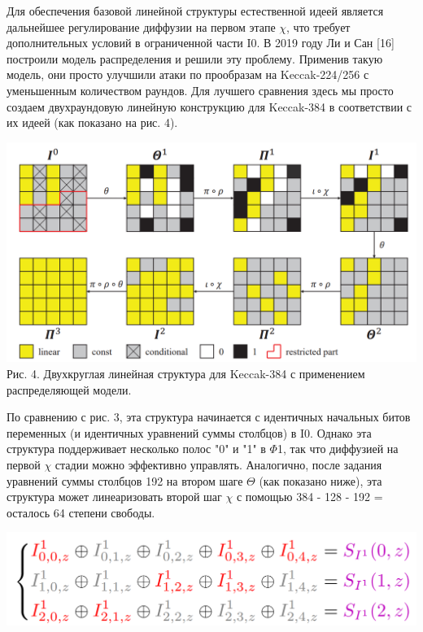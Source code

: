 \documentclass[utf8,14pt,a4paper,oneside,russian]{book}
\begin{document}
Для обеспечения базовой линейной структуры естественной идеей является дальнейшее регулирование
диффузии на первом этапе $\chi$, что требует дополнительных условий в ограниченной части I0.
В 2019 году Ли и Сан [16] построили модель распределения и решили эту проблему.
Применив такую модель, они просто улучшили атаки по прообразам на Keccak-224/256 с уменьшенным количеством раундов.
Для лучшего сравнения здесь мы просто создаем
двухраундовую линейную конструкцию для Keccak-384 в соответствии с их идеей (как показано на рис. 4).

\begin{center}
    \includegraphics*[scale=0.45]{11}\\
    Рис. 4. Двухкруглая линейная структура для Keccak-384 с применением распределяющей модели.
\end{center}

По сравнению с рис. 3, эта структура начинается с идентичных начальных битов переменных
(и идентичных уравнений суммы столбцов) в I0. Однако эта структура поддерживает
несколько полос "0" и "1" в $\Phi$1, так что диффузией на первой $\chi$ стадии можно
эффективно управлять. Аналогично, после задания уравнений суммы столбцов 192 на
втором шаге $\Theta$ (как показано ниже), эта структура может линеаризовать второй шаг $\chi$
с помощью 384 - 128 - 192 = осталось 64 степени свободы.

\begin{center}
    \includegraphics*[scale=0.45]{12}
\end{center}
\end{document}

